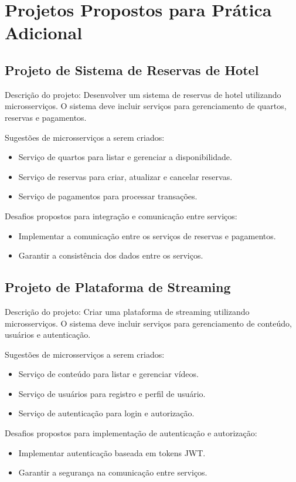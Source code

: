 \documentclass[a4paper,12pt]{book}
\begin{document}
\section{Projetos Propostos para Prática Adicional}

\subsection{Projeto de Sistema de Reservas de Hotel}
Descrição do projeto:
Desenvolver um sistema de reservas de hotel utilizando microsserviços. O sistema deve incluir serviços para gerenciamento de quartos, reservas e pagamentos.

Sugestões de microsserviços a serem criados:
\begin{itemize}
  \item Serviço de quartos para listar e gerenciar a disponibilidade.
  \item Serviço de reservas para criar, atualizar e cancelar reservas.
  \item Serviço de pagamentos para processar transações.
\end{itemize}

Desafios propostos para integração e comunicação entre serviços:
\begin{itemize}
  \item Implementar a comunicação entre os serviços de reservas e pagamentos.
  \item Garantir a consistência dos dados entre os serviços.
\end{itemize}

\subsection{Projeto de Plataforma de Streaming}
Descrição do projeto:
Criar uma plataforma de streaming utilizando microsserviços. O sistema deve incluir serviços para gerenciamento de conteúdo, usuários e autenticação.

Sugestões de microsserviços a serem criados:
\begin{itemize}
  \item Serviço de conteúdo para listar e gerenciar vídeos.
  \item Serviço de usuários para registro e perfil de usuário.
  \item Serviço de autenticação para login e autorização.
\end{itemize}

Desafios propostos para implementação de autenticação e autorização:
\begin{itemize}
  \item Implementar autenticação baseada em tokens JWT.
  \item Garantir a segurança na comunicação entre serviços.
\end{itemize}
\end{document}
